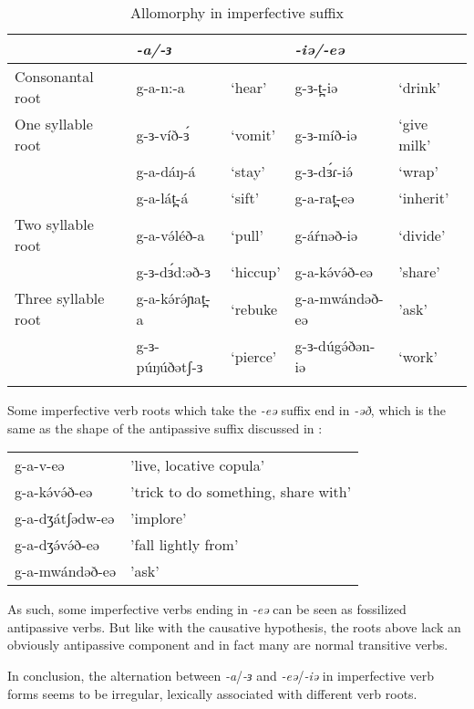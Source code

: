  	\begin{table}
 		\begin{tabular}[t]{lllll} %
\lsptoprule
	& \textit{-a/-ɜ}  &  & 	\textit{-iə/-eə} & \\
\midrule
Consonantal root& g-a-n:-a	&	‘hear’ & g-ɜ-t̪-iə	&	‘drink’\\
One syllable root	& g-ɜ-víð-ɜ́	&	‘vomit’	&  g-ɜ-míð-iə	&	‘give milk’ \\
& 	g-a-dáŋ-á	&	‘stay’	& g-ɜ-dɜ́ɾ-iə́	&	‘wrap’  \\ 
	& g-a-lát̪-á	&	‘sift’	& g-a-rat̪-eə	&	‘inherit’ \\ 
Two syllable root	& g-a-və́léð-a & ‘pull’	& g-áŕnəð-iə	&	`divide'\\
	& g-ɜ-dɜ́d:əð-ɜ	&	`hiccup' & g-a-kə́və́ð-eə		&	'share'  \\ 
Three syllable root	& g-a-kə́rə́ɲat̪-a		&	`rebuke &  g-a-mwándəð-eə	& 'ask'\\
	& g-ɜ-púŋúðətʃ-ɜ	&	`pierce'	&  g-ɜ-dúgə́ðən-iə	&	`work' \\ 
\lspbottomrule
\end{tabular}
	\caption{Allomorphy in imperfective suffix}
		\label{tab:ch11:ipfvfv}
\end{table}

Some imperfective verb roots which take the \textit{-eə} suffix end in \textit{-əð}, which is the same as the shape of the antipassive suffix discussed in :

\ea 	
\begin{tabular}[t]{ll}
g-a-v-eə		&	'live, locative copula'\\
g-a-kə́və́ð-eə		&	'trick to do something, share with'\\
g-a-dʒátʃədw-eə	&	'implore'\\
g-a-dʒə́və́ð-eə		&	'fall lightly from'\\
g-a-mwándəð-eə	&	'ask' \\	
\end{tabular}
\z 

As such, some imperfective verbs ending in \textit{-eə} can be seen as fossilized antipassive verbs. But like with the causative hypothesis, the roots above lack an obviously antipassive component and in fact many are normal transitive verbs.

In conclusion, the alternation between \textit{-a}/\textit{-ɜ} and \textit{-eə}/\textit{-iə} in imperfective verb forms seems to be irregular, lexically associated with different verb roots.

